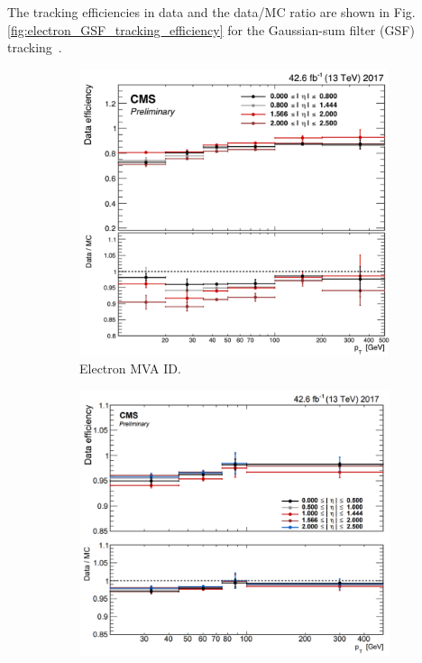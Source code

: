 The tracking efficiencies in data and the data/MC ratio are shown in Fig. \ref{fig:electron_GSF_tracking_efficiency} for the Gaussian-sum filter (GSF) tracking~\cite{CMS-DP-2020-037}. 

\begin{figure}[ht]
    \centering
    \begin{subfigure}{0.45\textwidth}
        \includegraphics[width=1.0\textwidth]{figures/ch-5-object-reconstruction-and-corrections-applied/electron_MVA_90wp_identification_efficiency}
        \caption{Electron MVA ID.}
        \label{fig:electron_MVA_ID_efficiency}
    \end{subfigure}
    \hfill
    \begin{subfigure}{0.45\textwidth}
        \includegraphics[width=1.0\textwidth]{figures/ch-5-object-reconstruction-and-corrections-applied/electron_gsf_tracking_efficiency}

\end{subfigure}
\end{figure}
